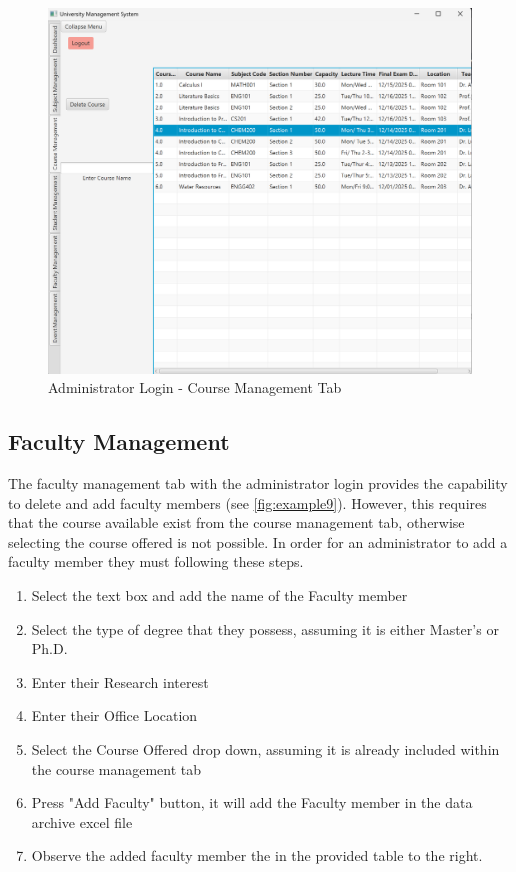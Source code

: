 \begin{figure}[h]
    \centering
        \centering\includegraphics[width=1\linewidth]{figures/Course_Management.png}
        \caption{Administrator Login - Course Management Tab}
\end{figure}


\subsection{Faculty Management}

The faculty management tab with the administrator login provides the capability to delete and add faculty members (see \autoref{fig:example9}). However, this requires that the course available exist from the course management tab, otherwise selecting the course offered is not possible. In order for an administrator to add a faculty member they must following these steps.

\begin{enumerate}
    \item Select the text box and add the name of the Faculty member
    \item Select the type of degree that they possess, assuming it is either Master's or Ph.D.
    \item Enter their Research interest
    \item Enter their Office Location
    \item Select the Course Offered drop down, assuming it is already included within the course management tab
    \item Press "Add Faculty" button, it will add the Faculty member in the data archive excel file
    \item Observe the added faculty member the in the provided table to the right.
\end{enumerate}


